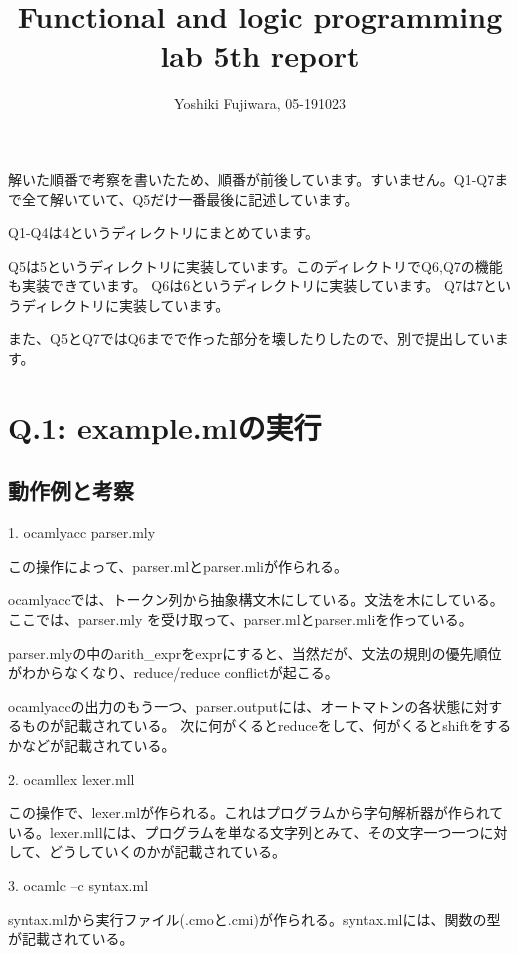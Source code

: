 \documentclass[uplatex,12pt]{jsarticle}
\title {Functional and logic programming lab 5th report}
\date{}
\begin{document}
\author{Yoshiki Fujiwara, 05-191023}
\maketitle

解いた順番で考察を書いたため、順番が前後しています。すいません。Q1-Q7まで全て解いていて、Q5だけ一番最後に記述しています。

Q1-Q4は4というディレクトリにまとめています。

Q5は5というディレクトリに実装しています。このディレクトリでQ6,Q7の機能も実装できています。
Q6は6というディレクトリに実装しています。
Q7は7というディレクトリに実装しています。

また、Q5とQ7ではQ6までで作った部分を壊したりしたので、別で提出しています。


\section{Q.1: example.mlの実行}
\subsection{動作例と考察}

1. ocamlyacc parser.mly

この操作によって、parser.mlとparser.mliが作られる。

ocamlyaccでは、トークン列から抽象構文木にしている。文法を木にしている。
ここでは、parser.mly を受け取って、parser.mlとparser.mliを作っている。

parser.mlyの中のarith_exprをexprにすると、当然だが、文法の規則の優先順位がわからなくなり、reduce/reduce conflictが起こる。

ocamlyaccの出力のもう一つ、parser.outputには、オートマトンの各状態に対するものが記載されている。
次に何がくるとreduceをして、何がくるとshiftをするかなどが記載されている。

\vspace{12pt}

2. ocamllex lexer.mll

この操作で、lexer.mlが作られる。これはプログラムから字句解析器が作られている。lexer.mllには、プログラムを単なる文字列とみて、その文字一つ一つに対して、どうしていくのかが記載されている。

\vspace{12pt}

3. ocamlc –c syntax.ml

syntax.mlから実行ファイル(.cmoと.cmi)が作られる。syntax.mlには、関数の型が記載されている。
\end{document}
